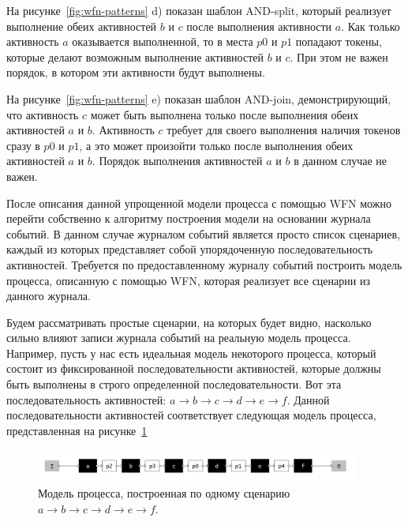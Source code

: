 \documentclass[
11pt,%
tightenlines,%
twoside,%
onecolumn,%
nofloats,%
nobibnotes,%
nofootinbib,%
superscriptaddress,%
noshowpacs,%
centertags]%
{revtex4}
\begin{document}
На рисунке~\ref{fig:wfn-patterns} d) показан шаблон AND-split, который реализует выполнение обеих активностей $b$ и $c$ после выполнения активности $a$.
Как только активность $a$ оказывается выполненной, то в места $p0$ и $p1$ попадают токены, которые делают возможным выполнение активностей $b$ и $c$.
При этом не важен порядок, в котором эти активности будут выполнены.

На рисунке~\ref{fig:wfn-patterns} e) показан шаблон AND-join, демонстрирующий, что активность $c$ может быть выполнена только после выполнения обеих активностей $a$ и $b$.
Активность $c$ требует для своего выполнения наличия токенов сразу в $p0$ и $p1$, а это может произойти только после выполнения обеих активностей $a$ и $b$.
Порядок выполнения активностей $a$ и $b$ в данном случае не важен.

После описания данной упрощенной модели процесса с помощью WFN можно перейти собственно к алгоритму построения модели на основании журнала событий.
В данном случае журналом событий является просто список сценариев, каждый из которых представляет собой упорядоченную последовательность активностей.
Требуется по предоставленному журналу событий построить модель процесса, описанную с помощью WFN, которая реализует все сценарии из данного журнала.

Будем рассматривать простые сценарии, на которых будет видно, насколько сильно влияют записи журнала событий на реальную модель процесса.
Например, пусть у нас есть идеальная модель некоторого процесса, который состоит из фиксированной последовательности активностей, которые должны быть выполнены в строго определенной последовательности.
Вот эта последовательность активностей: $a \rightarrow b \rightarrow c \rightarrow d \rightarrow e \rightarrow f$.
Данной последовательности активностей соответствует следующая модель процесса, представленная на рисунке~\ref{fig:origin1}

\begin{figure}[h]
\setcaptionmargin{5mm}
\includegraphics[width=0.95\textwidth]{pics/origin1.png}
\caption{Модель процесса, построенная по одному сценарию $a \rightarrow b \rightarrow c \rightarrow d \rightarrow e \rightarrow f$.}
\label{fig:origin1}
\end{figure}
\end{document}

